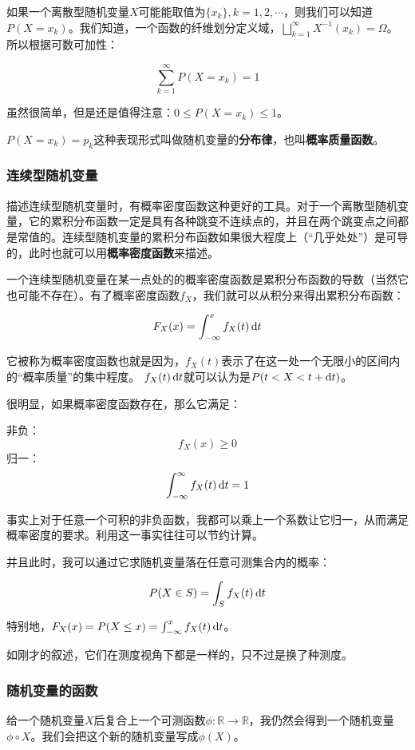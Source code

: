 如果一个离散型随机变量$X$可能能取值为$\{x_k\},k=1,2,\cdots$，则我们可以知道$P(X=x_k)$。我们知道，一个函数的纤维划分定义域，$\bigsqcup_{k=1}^{\infty}X^{-1}(x_k) = \Omega$。所以根据可数可加性：

\[
\sum_{k=1}^{\infty}P(X=x_k) =1
\]

虽然很简单，但是还是值得注意：$0\leq P(X=x_k)\leq 1$。

$P(X=x_k)=p_k$这种表现形式叫做随机变量的\textbf{分布律}，也叫\textbf{概率质量函数}。

\subsubsection{连续型随机变量}

描述连续型随机变量时，有概率密度函数这种更好的工具。对于一个离散型随机变量，它的累积分布函数一定是具有各种跳变不连续点的，并且在两个跳变点之间都是常值的。连续型随机变量的累积分布函数如果很大程度上（“几乎处处”）是可导的，此时也就可以用\textbf{概率密度函数}来描述。

一个连续型随机变量在某一点处的的概率密度函数是累积分布函数的导数（当然它也可能不存在）。有了概率密度函数$f_X$，我们就可以从积分来得出累积分布函数：

\[
F_X(x) = \int_{-\infty}^{x}f_X(t)\mathop{}\!\mathrm{d} t
\]

它被称为概率密度函数也就是因为，$f_X(t)$表示了在这一处一个无限小的区间内的“概率质量”的集中程度。
$f_X(t)\mathop{}\!\mathrm{d} t$就可以认为是$P(t<X<t+\mathop{}\!\mathrm{d} t)$。

很明显，如果概率密度函数存在，那么它满足：

非负：
\[
f_X(x)\geq 0
\]
归一：
\[
\int_{-\infty}^{\infty}f_X(t)\mathop{}\!\mathrm{d} t = 1
\]

事实上对于任意一个可积的非负函数，我都可以乘上一个系数让它归一，从而满足概率密度的要求。利用这一事实往往可以节约计算。

并且此时，我可以通过它求随机变量落在任意可测集合内的概率：

\[
P(X\in S)=\int_{S}f_X(t)\mathop{}\!\mathrm{d} t
\]

特别地，$F_X(x)=P(X\leq x)=\int_{-\infty}^{x}f_X(t)\mathop{}\!\mathrm{d} t$。

如刚才的叙述，它们在测度视角下都是一样的，只不过是换了种测度。

\subsubsection{随机变量的函数}

给一个随机变量$X$后复合上一个可测函数$\phi:\mathbb{R}\to\mathbb{R}$，我仍然会得到一个随机变量$\phi\circ X$。我们会把这个新的随机变量写成$\phi(X)$。

